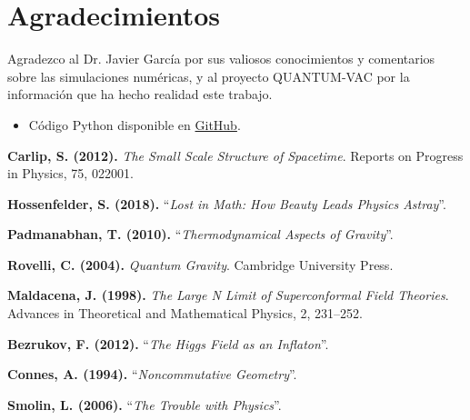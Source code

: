 \documentclass[a4paper]{article}
\theoremstyle{definition}
\theoremstyle{remark}
\numberwithin{equation}{section}
\begin{document}
	\section*{Agradecimientos}
		Agradezco al Dr. Javier García por sus valiosos conocimientos y comentarios sobre las simulaciones numéricas, y al proyecto QUANTUM-VAC por la información que ha hecho realidad este trabajo.
	\begin{itemize}
		\item Código Python disponible en \href{https://github.com/KerymMacryn/VA-Theory}{GitHub}.
	\end{itemize}
	
	
	\begin{thebibliography}{9}
		\textbf{Carlip, S. (2012).} \textit{The Small Scale Structure of Spacetime}. Reports on Progress in Physics, 75, 022001.
		
		 \textbf{Hossenfelder, S. (2018).} ``\textit{Lost in Math: How Beauty Leads Physics Astray}''. 		
		
		 \textbf{Padmanabhan, T. (2010).} ``\textit{Thermodynamical Aspects of Gravity}''.
		
		 \textbf{Rovelli, C. (2004).} \textit{Quantum Gravity}. Cambridge University Press.
		
		 \textbf{Maldacena, J. (1998).} \textit{The Large N Limit of Superconformal Field Theories}. Advances in Theoretical and Mathematical Physics, 2, 231–252.
		
		 \textbf{Bezrukov, F. (2012).} ``\textit{The Higgs Field as an Inflaton}''. 
		
		 \textbf{Connes, A. (1994).} ``\textit{Noncommutative Geometry}''.
		
		 \textbf{Smolin, L. (2006).} ``\textit{The Trouble with Physics}''.
		
	\end{thebibliography}
	
\end{document}
